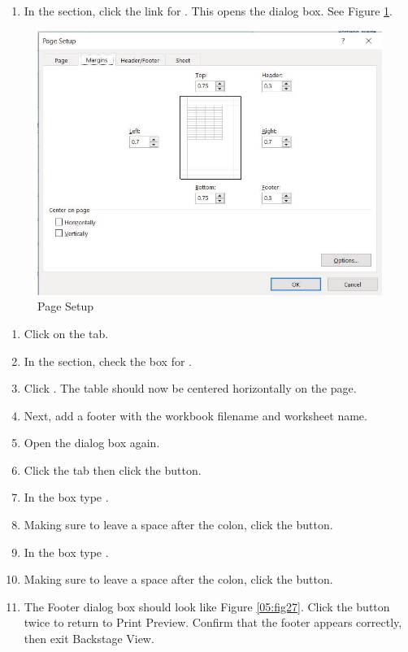 \begin{enumerate}
	\item In the  section, click the link for . This opens the  dialog box. See Figure \ref{05:fig26}.
\end{enumerate}

\begin{figure}[H]
	\centering
	\includegraphics[width=\maxwidth{.95\linewidth}]{gfx/ch05_fig26}
	\caption{Page Setup}
	\label{05:fig26}
\end{figure}

\begin{enumerate}[resume]
	\item Click on the  tab.
	\item In the  section, check the box for .
	\item Click . The table should now be centered horizontally on the page.
	\item Next, add a footer with the workbook filename and worksheet name.
	\item Open the  dialog box again.
	\item Click the  tab then click the  button.
	\item In the  box type .
	\item Making sure to leave a space after the colon, click the  button.
	\item In the  box type .
	\item Making sure to leave a space after the colon, click the  button.
	\item The Footer dialog box should look like Figure \ref{05:fig27}. Click the  button twice to return to Print Preview. Confirm that the footer appears correctly, then exit Backstage View.
\end{enumerate}

